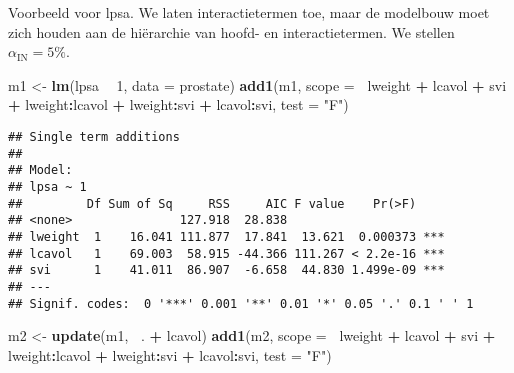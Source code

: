 \documentclass[12pt,dutch,coursenotes]{book}
\newenvironment{Shaded}{\begin{snugshade}}{\end{snugshade}}
\newcommand{\KeywordTok}[1]{\textcolor[rgb]{0.13,0.29,0.53}{\textbf{#1}}}
\newcommand{\DataTypeTok}[1]{\textcolor[rgb]{0.13,0.29,0.53}{#1}}
\newcommand{\DecValTok}[1]{\textcolor[rgb]{0.00,0.00,0.81}{#1}}
\newcommand{\StringTok}[1]{\textcolor[rgb]{0.31,0.60,0.02}{#1}}
\newcommand{\OperatorTok}[1]{\textcolor[rgb]{0.81,0.36,0.00}{\textbf{#1}}}
\newcommand{\NormalTok}[1]{#1}
\theoremstyle{definition}
\theoremstyle{definition}
\theoremstyle{definition}
\theoremstyle{remark}
\begin{document}
Voorbeeld voor lpsa. We laten interactietermen toe, maar de modelbouw
moet zich houden aan de hiërarchie van hoofd- en interactietermen. We
stellen \(\alpha_{\text{IN}}=5\%\).

\begin{Shaded}
\begin{Highlighting}[]
\NormalTok{m1 <-}\StringTok{ }\KeywordTok{lm}\NormalTok{(lpsa }\OperatorTok{~}\StringTok{ }\DecValTok{1}\NormalTok{, }\DataTypeTok{data =}\NormalTok{ prostate)}
\KeywordTok{add1}\NormalTok{(m1, }\DataTypeTok{scope =} \OperatorTok{~}\NormalTok{lweight }\OperatorTok{+}\StringTok{ }\NormalTok{lcavol }\OperatorTok{+}\StringTok{ }\NormalTok{svi }\OperatorTok{+}\StringTok{ }\NormalTok{lweight}\OperatorTok{:}\NormalTok{lcavol }\OperatorTok{+}\StringTok{ }
\StringTok{    }\NormalTok{lweight}\OperatorTok{:}\NormalTok{svi }\OperatorTok{+}\StringTok{ }\NormalTok{lcavol}\OperatorTok{:}\NormalTok{svi, }\DataTypeTok{test =} \StringTok{"F"}\NormalTok{)}
\end{Highlighting}
\end{Shaded}

\begin{verbatim}
## Single term additions
## 
## Model:
## lpsa ~ 1
##         Df Sum of Sq     RSS     AIC F value    Pr(>F)    
## <none>               127.918  28.838                      
## lweight  1    16.041 111.877  17.841  13.621  0.000373 ***
## lcavol   1    69.003  58.915 -44.366 111.267 < 2.2e-16 ***
## svi      1    41.011  86.907  -6.658  44.830 1.499e-09 ***
## ---
## Signif. codes:  0 '***' 0.001 '**' 0.01 '*' 0.05 '.' 0.1 ' ' 1
\end{verbatim}

\begin{Shaded}
\begin{Highlighting}[]
\NormalTok{m2 <-}\StringTok{ }\KeywordTok{update}\NormalTok{(m1, }\OperatorTok{~}\NormalTok{. }\OperatorTok{+}\StringTok{ }\NormalTok{lcavol)}
\KeywordTok{add1}\NormalTok{(m2, }\DataTypeTok{scope =} \OperatorTok{~}\NormalTok{lweight }\OperatorTok{+}\StringTok{ }\NormalTok{lcavol }\OperatorTok{+}\StringTok{ }\NormalTok{svi }\OperatorTok{+}\StringTok{ }\NormalTok{lweight}\OperatorTok{:}\NormalTok{lcavol }\OperatorTok{+}\StringTok{ }
\StringTok{    }\NormalTok{lweight}\OperatorTok{:}\NormalTok{svi }\OperatorTok{+}\StringTok{ }\NormalTok{lcavol}\OperatorTok{:}\NormalTok{svi, }\DataTypeTok{test =} \StringTok{"F"}\NormalTok{)}
\end{Highlighting}
\end{Shaded}
\end{document}
